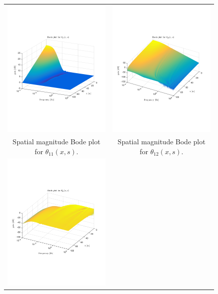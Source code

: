 \documentclass[preprint]{elsarticle}
\begin{document}
\begin{figure}
\centering
\begin{tabular}{cc}
\includegraphics[trim = 0mm 60mm 0mm 60mm, width = 8cm]{distr_theta_11}
&
\includegraphics[trim = 0mm 60mm 0mm 60mm, width = 8cm]{distr_theta_12}
\tabularnewline
Spatial magnitude Bode plot for $\theta_{11}(x,s)$.
&
Spatial magnitude Bode plot for $\theta_{12}(x,s)$.
\tabularnewline
\includegraphics[trim = 0mm 60mm 0mm 60mm, width = 8cm]{distr_theta_21}

\end{tabular}
\end{figure}
\end{document}
